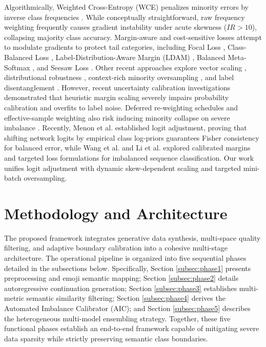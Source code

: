 \documentclass{ieeeaccess}
\begin{document}
Algorithmically, Weighted Cross-Entropy (WCE) penalizes minority errors by inverse class frequencies \cite{zhang2023deep, alshammari2022long}. While conceptually straightforward, raw frequency weighting frequently causes gradient instability under acute skewness ($IR > 10$), collapsing majority class accuracy. Margin-aware and cost-sensitive losses attempt to modulate gradients to protect tail categories, including Focal Loss \cite{lin2017focal}, Class-Balanced Loss \cite{cui2019class}, Label-Distribution-Aware Margin (LDAM) \cite{cao2019learning}, Balanced Meta-Softmax \cite{ren2020balanced}, and Seesaw Loss \cite{wang2021seesaw}. Other recent approaches explore vector scaling \cite{kini2021vector}, distributional robustness \cite{samuel2021distributional}, context-rich minority oversampling \cite{park2022majority}, and label disentanglement \cite{hong2021disentangling}. However, recent uncertainty calibration investigations \cite{guo2017calibration, minderer2021revisiting, zhong2021improving, wang2023margin} demonstrated that heuristic margin scaling severely impairs probability calibration and overfits to label noise. Deferred re-weighting schedules and effective-sample weighting also risk inducing minority collapse on severe imbalance \cite{thrampoulidis2022imbalance, fang2021exploring}. Recently, Menon et al. \cite{menon2021longtail} established logit adjustment, proving that shifting network logits by empirical class log-priors guarantees Fisher consistency for balanced error, while Wang et al. \cite{wang2023margin} and Li et al. \cite{li2022targeted} explored calibrated margins and targeted loss formulations for imbalanced sequence classification. Our work unifies logit adjustment with dynamic skew-dependent scaling and targeted mini-batch oversampling.

\section{Methodology and Architecture}
\label{sec:methodology}

The proposed framework integrates generative data synthesis, multi-space quality filtering, and adaptive boundary calibration into a cohesive multi-stage architecture. The operational pipeline is organized into five sequential phases detailed in the subsections below. Specifically, Section \ref{subsec:phase1} presents preprocessing and emoji semantic mapping; Section \ref{subsec:phase2} details autoregressive continuation generation; Section \ref{subsec:phase3} establishes multi-metric semantic similarity filtering; Section \ref{subsec:phase4} derives the Automated Imbalance Calibrator (AIC); and Section \ref{subsec:phase5} describes the heterogeneous multi-model ensembling strategy. Together, these five functional phases establish an end-to-end framework capable of mitigating severe data sparsity while strictly preserving semantic class boundaries.
\end{document}
